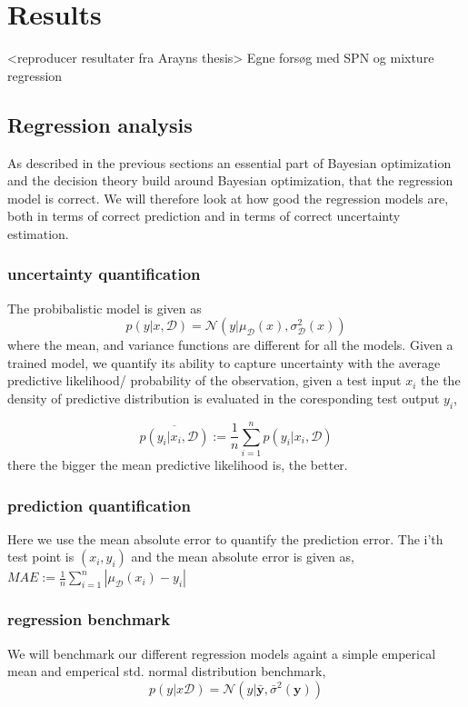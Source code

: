 \chapter{Results}
<reproducer resultater fra Arayns thesis>
Egne forsøg med SPN og mixture regression


\section{Regression analysis}
As described in the previous sections an essential part of Bayesian optimization and the decision theory build 
around Bayesian optimization, that the regression model is correct. We will therefore look at how good the
regression models are, both in terms of correct prediction and in terms of correct uncertainty estimation. 

\subsection{uncertainty quantification}
The probibalistic model is given as 
$$p(y|x,\mathcal{D}) = \mathcal{N}(y|\mu_{\mathcal{D}}(x), \sigma_{\mathcal{D}}^2(x))$$
where the mean, and variance functions are different for all the models. 
Given a trained model, we quantify its ability to capture uncertainty with the average
predictive likelihood/ probability of the observation, given a test input $x_i$ the
the density of predictive distribution is evaluated in the coresponding test output $y_i$,

$$\overline{p(y_i|x_i,\mathcal{D})} := \frac{1}{n}\sum_{i=1}^n p(y_i|x_i,\mathcal{D})$$
there the bigger the mean predictive likelihood is, the better. 

\subsection{prediction quantification}
Here we use the mean absolute error to quantify the prediction error. The i'th test point is
$(x_i,y_i)$ and the mean absolute error is given as, 
$MAE :=\frac{1}{n}\sum_{i=1}^n |\mu_{\mathcal{D}}(x_i) - y_i| $

\subsection{regression benchmark}
We will benchmark our different regression models againt a simple emperical mean and
emperical std. normal distribution benchmark, 
$$p(y|x\mathcal{D}) = \mathcal{N}(y| \bar{\textbf{y}} , \bar{\sigma}^2 (\textbf{y}))$$

